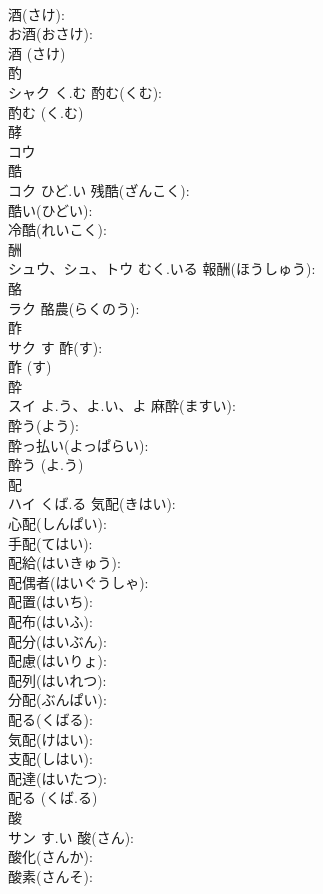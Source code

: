\documentclass[8pt]{extreport}
\begin{document}
\begin{CJK}{UTF8}{min}
\\	酒(さけ): 
\\	お酒(おさけ): 
\\	酒 (さけ)
\\	酌			
\\	シャク	く.む	酌む(くむ): 
\\	酌む (く.む)
\\	酵			
\\	コウ			
\\	酷			
\\	コク	ひど.い	残酷(ざんこく): 
\\	酷い(ひどい): 
\\	冷酷(れいこく): 
\\	酬			
\\	シュウ、シュ、トウ	むく.いる	報酬(ほうしゅう): 
\\	酪			
\\	ラク		酪農(らくのう): 
\\	酢			
\\	サク	す	酢(す): 
\\	酢 (す)
\\	酔			
\\	スイ	よ.う、よ.い、よ	麻酔(ますい): 
\\	酔う(よう): 
\\	酔っ払い(よっぱらい): 
\\	酔う (よ.う)
\\	配			
\\	ハイ	くば.る	気配(きはい): 
\\	心配(しんぱい): 
\\	手配(てはい): 
\\	配給(はいきゅう): 
\\	配偶者(はいぐうしゃ): 
\\	配置(はいち): 
\\	配布(はいふ): 
\\	配分(はいぶん): 
\\	配慮(はいりょ): 
\\	配列(はいれつ): 
\\	分配(ぶんぱい): 
\\	配る(くばる): 
\\	気配(けはい): 
\\	支配(しはい): 
\\	配達(はいたつ): 
\\	配る (くば.る)
\\	酸			
\\	サン	す.い	酸(さん): 
\\	酸化(さんか): 
\\	酸素(さんそ): 

\end{CJK}
\end{document}

